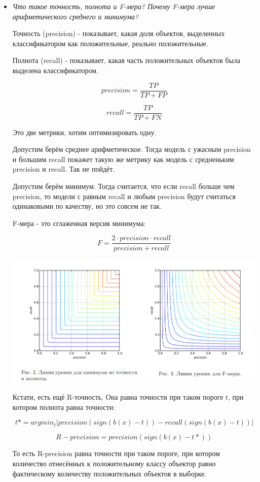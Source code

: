 \documentclass[12pt]{article}
\begin{document}
\begin{itemize}
\item \textit{Что такое точность, полнота и F-мера? Почему F-мера лучше арифметического среднего и минимума?}

Точность (precision) - показывает, какая доля объектов, выделенных классификатором как положительные, реально положительные.

Полнота (recall) - показывает, какая часть положительных объектов была выделена классификатором.

\[ precision = \frac{TP}{TP+FP} \]

\[ recall = \frac{TP}{TP+FN} \]

Это две метрики, хотим оптимизировать одну.

Допустим берём среднее арифметическое. Тогда модель с ужасным precision и большим recall покажет такую же метрику как модель с средненьким precision и recall. Так не пойдёт.

Допустим берём минимум. Тогда считается, что если recall больше чем precision, то модели с равным recall и любым precision будут считаться одинаковыми по качеству, но это совсем не так.

F-мера - это сглаженная версия минимума:

\[ F = \frac{2 \cdot precision \cdot recall}{precision + recall} \]

\includegraphics[width=18cm]{f-measure.png}

Кстати, есть ещё R-точность. Она равна точности при таком пороге $t$, при котором полнота равна точности:

\[ t* = argmin_t |precision(sign(b(x)-t)) - recall(sign(b(x) - t))| \]

\[R-precision = precision(sign(b(x)-t*))\]

То есть R-precision равна точности при таком пороге, при котором количество отнесённых к положительному классу объектор равно фактическому количеству положительных объектов в выборке.


\end{itemize}
\end{document}
